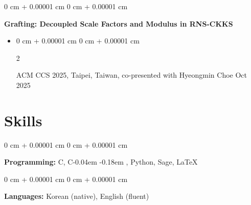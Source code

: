 \documentclass[10pt, letterpaper]{article}
\newenvironment{highlights}{
    \begin{itemize}[
        topsep=0.10 cm,
        parsep=0.10 cm,
        partopsep=0pt,
        itemsep=0pt,
        leftmargin=0 cm + 10pt
    ]
}{
    \end{itemize}
} %
\newenvironment{onecolentry}{
    \begin{adjustwidth}{
        0 cm + 0.00001 cm
    }{
        0 cm + 0.00001 cm
    }
}{
    \end{adjustwidth}
} %
\newenvironment{twocolentry}[2][]{
    \onecolentry
    \def\secondColumn{#2}
    \setcolumnwidth{\fill, 4.5 cm}
    \begin{paracol}{2}
}{
    \switchcolumn \raggedleft \secondColumn
    \end{paracol}
    \endonecolentry
} %
\newcommand{\CPP}{%
  C\kern-0.04em%
  \raisebox{0.2ex}{\footnotesize\textbf{+}}%
  \kern-0.18em%
  \raisebox{0.2ex}{\footnotesize\textbf{+}}%
}
\begin{document}
    \vspace{0.2 cm}
    \begin{onecolentry}
        \textbf{Grafting: Decoupled Scale Factors and Modulus in RNS-CKKS} 
    \end{onecolentry}
    \begin{highlights}
        \item \begin{twocolentry}{Oct 2025}
        ACM CCS 2025, Taipei, Taiwan, co-presented with Hyeongmin Choe \end{twocolentry}
    \end{highlights}


    

    
    \section{Skills}
        \begin{onecolentry}
            \textbf{Programming:} C, \CPP, Python, Sage, \LaTeX{}
        \end{onecolentry}
        \vspace{0.2 cm}
        \begin{onecolentry}
            \textbf{Languages:} Korean (native), English (fluent)
        \end{onecolentry}
\end{document}

